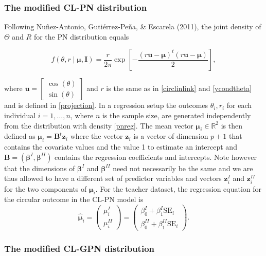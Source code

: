 \documentclass[12pt,]{article}
\begin{document}
\subsubsection{The modified CL-PN distribution}

Following Nuñez-Antonio, Gutiérrez-Peña, \& Escarela (2011), the joint
density of \(\Theta\) and \(R\) for the PN distribution equals

\begin{equation}\label{pnreg}
f(\theta,r \mid \boldsymbol{\mu}, \boldsymbol{I}) = \frac{r}{2\pi} \exp\left[- \frac{(r\boldsymbol{u} - \boldsymbol{\mu})^t(r\boldsymbol{u} - \boldsymbol{\mu})}{2}\right],
\end{equation}

\noindent where
\(\boldsymbol{u}= \begin{bmatrix} \cos (\theta) \\ \sin (\theta) \end{bmatrix}\)
and \(r\) is the same as in \eqref{circlinlink} and \eqref{ycondtheta}
and is defined in \eqref{projection}. In a regression setup the outcomes
\(\theta_i,r_i\) for each individual \(i = 1, \dots, n\), where \(n\) is
the sample size, are generated independently from the distribution with
density \eqref{pnreg}. The mean vector
\(\boldsymbol{\mu}_i \in \mathbb{R}^2\) is then defined as
\(\boldsymbol{\mu}_i = \boldsymbol{B}^t\boldsymbol{z}_i\) where the
vector \(\boldsymbol{z}_i\) is a vector of dimension \(p + 1\) that
contains the covariate values and the value 1 to estimate an intercept
and
\(\boldsymbol{B} = (\boldsymbol{\beta}^{I}, \boldsymbol{\beta}^{II})\)
contains the regression coefficients and intercepts. Note however that
the dimensions of \(\boldsymbol{\beta}^{I}\) and
\(\boldsymbol{\beta }^{II}\) need not necessarily be the same and we are
thus allowed to have a different set of predictor variables and vectors
\(\boldsymbol{z}_i^I\) and \(\boldsymbol{z}_i^{II}\) for the two
components of \(\boldsymbol{\mu}_i\). For the teacher dataset, the
regression equation for the circular outcome in the CL-PN model is
\[\hat{\boldsymbol{\mu}}_{i} = \begin{pmatrix} \mu_{i}^{I}  \\ \mu_{i}^{II}
\end{pmatrix}=\begin{pmatrix} \beta_0^{I} + \beta_1^{I}\text{SE}_i  \\
\beta_0^{II} + \beta_1^{II}\text{SE}_i \end{pmatrix}.\]

\subsubsection{The modified CL-GPN distribution}
\end{document}
